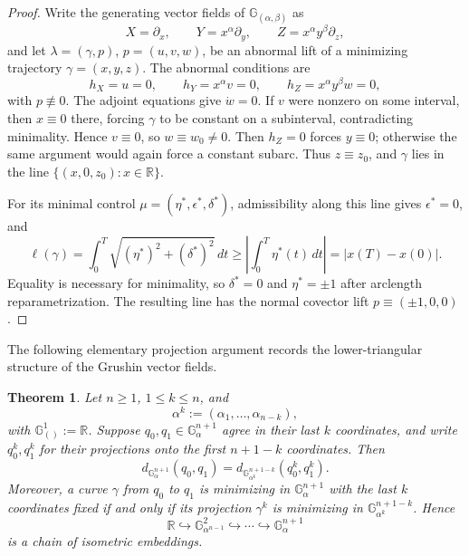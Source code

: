 \documentclass[12pt]{amsart}
\numberwithin{equation}{section}
\theoremstyle{plain}
\newtheorem{theorem}{Theorem}[section]
\theoremstyle{definition}
\theoremstyle{remark}
\begin{document}
\begin{proof}
    Write the generating vector fields of $\mathbb{G}_{(\alpha,\beta)}$ as
    \[
        X=\partial_x,\qquad
        Y=x^\alpha\partial_y,\qquad
        Z=x^\alpha y^\beta\partial_z,
    \]
    and let \(\lambda=(\gamma,p)\), \(p=(u,v,w)\), be an abnormal lift of a minimizing
    trajectory \(\gamma=(x,y,z)\). The abnormal conditions are
    \[
        h_X=u=0,\qquad
        h_Y=x^\alpha v=0,\qquad
        h_Z=x^\alpha y^\beta w=0,
    \]
    with \(p\not\equiv 0\). The adjoint equations give \(\dot w=0\). If \(v\) were nonzero
    on some interval, then \(x\equiv 0\) there, forcing \(\gamma\) to be constant on a
    subinterval, contradicting minimality. Hence \(v\equiv 0\), so \(w\equiv w_0\neq 0\).
    Then \(h_Z=0\) forces \(y\equiv 0\); otherwise the same argument would again force a
    constant subarc. Thus \(z\equiv z_0\), and \(\gamma\) lies in the line
    \(\{(x,0,z_0):x\in\mathbb R\}\).

    For its minimal control \(\mu=(\eta^*,\epsilon^*,\delta^*)\), admissibility along this
    line gives \(\epsilon^*=0\), and
    \[
        \ell(\gamma)
        =
        \int_0^T\sqrt{(\eta^*)^2+(\delta^*)^2}\,dt
        \geq
        \left|\int_0^T\eta^*(t)\,dt\right|
        =
        |x(T)-x(0)|.
    \]
    Equality is necessary for minimality, so \(\delta^*=0\) and \(\eta^*=\pm1\) after
    arclength reparametrization. The resulting line has the normal covector lift
    \(p\equiv(\pm1,0,0)\).
\end{proof}

The following elementary projection argument records the lower-triangular structure of the
Grushin vector fields.

\begin{theorem}\label{isometric embeddings}
    Let \(n\geq 1\), \(1\leq k\leq n\), and
    \[
        \alpha^k:=(\alpha_1,\ldots,\alpha_{n-k}),
    \]
    with \(\mathbb G^1_{()}:=\mathbb R\). Suppose \(q_0,q_1\in\mathbb G^{n+1}_\alpha\)
    agree in their last \(k\) coordinates, and write \(q_0^k,q_1^k\) for their projections
    onto the first \(n+1-k\) coordinates. Then
    \[
        d_{\mathbb G^{n+1}_\alpha}(q_0,q_1)
        =
        d_{\mathbb G^{n+1-k}_{\alpha^k}}(q_0^k,q_1^k).
    \]
    Moreover, a curve \(\gamma\) from \(q_0\) to \(q_1\) is minimizing in
    \(\mathbb G^{n+1}_\alpha\) with the last \(k\) coordinates fixed if and only if its
    projection \(\gamma^k\) is minimizing in \(\mathbb G^{n+1-k}_{\alpha^k}\). Hence
    \[
        \mathbb R
        \hookrightarrow
        \mathbb G^2_{\alpha^{n-1}}
        \hookrightarrow
        \cdots
        \hookrightarrow
        \mathbb G^{n+1}_\alpha
    \]
    is a chain of isometric embeddings.
\end{theorem}
\end{document}
